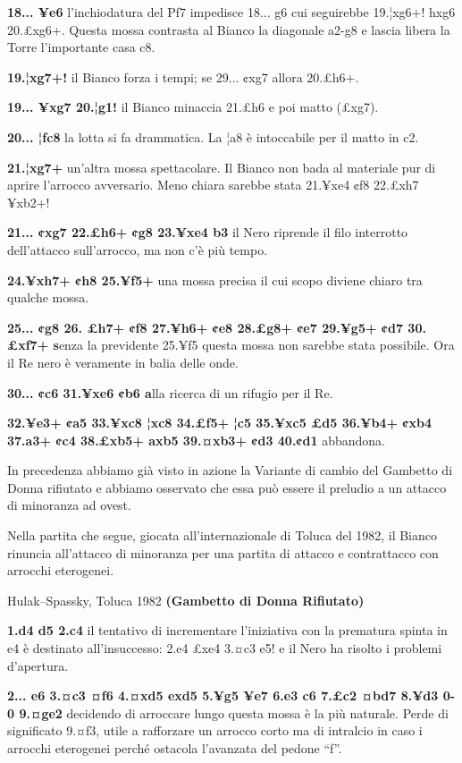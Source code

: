 \documentclass[
]{article}
\begin{document}
\textbf{18... ¥e6} l'inchiodatura del Pf7 impedisce 18... g6 cui
seguirebbe 19.¦xg6+! hxg6 20.£xg6+. Questa mossa contrasta al Bianco la
diagonale a2-g8 e lascia libera la Torre l'importante casa c8.

\textbf{19.¦xg7+!} il Bianco forza i tempi; se 29... ¢xg7 allora
20.£h6+.

\textbf{19... ¥xg7 20.¦g1!} il Bianco minaccia 21.£h6 e poi matto
(£xg7).

\textbf{20... ¦fc8} la lotta si fa drammatica. La ¦a8 è intoccabile per
il matto in c2.

\textbf{21.¦xg7+} un'altra mossa spettacolare. Il Bianco non bada al
materiale pur di aprire l'arrocco avversario. Meno chiara sarebbe stata
21.¥xe4 ¢f8 22.£xh7 ¥xb2+!

\textbf{21... ¢xg7 22.£h6+ ¢g8 23.¥xe4 b3} il Nero riprende il filo
interrotto dell'attacco sull'arrocco, ma non c'è più tempo.

\textbf{24.¥xh7+ ¢h8 25.¥f5+} una mossa precisa il cui scopo diviene
chiaro tra qualche mossa.

\textbf{25... ¢g8 26. £h7+ ¢f8 27.¥h6+ ¢e8 28.£g8+ ¢e7 29.¥g5+ ¢d7
30.£xf7+ s}enza la previdente 25.¥f5 questa mossa non sarebbe stata
possibile. Ora il Re nero è veramente in balia delle onde.

\textbf{30... ¢c6 31.¥xe6 ¢b6 a}lla ricerca di un rifugio per il Re.

\textbf{32.¥e3+ ¢a5 33.¥xc8 ¦xc8 34.£f5+ ¦c5 35.¥xc5 £d5 36.¥b4+ ¢xb4
37.a3+ ¢c4 38.£xb5+ axb5 39.¤xb3+ ¢d3 40.¢d1} abbandona.

In precedenza abbiamo già visto in azione la Variante di cambio del
Gambetto di Donna rifiutato e abbiamo osservato che essa può essere il
preludio a un attacco di minoranza ad ovest.

Nella partita che segue, giocata all'internazionale di Toluca del 1982,
il Bianco rinuncia all'attacco di minoranza per una partita di attacco e
contrattacco con arrocchi eterogenei.

Hulak--Spassky, Toluca 1982 \textbf{(Gambetto di Donna Rifiutato)}

\textbf{1.d4 d5 2.c4} il tentativo di incrementare l'iniziativa con la
prematura spinta in e4 è destinato all'insuccesso: 2.e4 £xe4 3.¤c3 e5! e
il Nero ha risolto i problemi d'apertura.

\textbf{2... e6 3.¤c3 ¤f6 4.¤xd5 exd5 5.¥g5 ¥e7 6.e3 c6 7.£c2 ¤bd7 8.¥d3
0-0 9.¤ge2} decidendo di arroccare lungo questa mossa è la più naturale.
Perde di significato 9.¤f3, utile a rafforzare un arrocco corto ma di
intralcio in caso i arrocchi eterogenei perché ostacola l'avanzata del
pedone ``f''.
\end{document}
